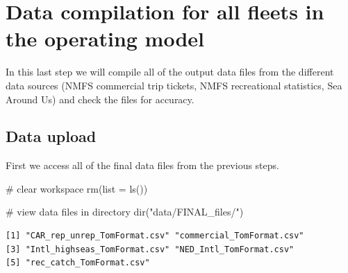 \documentclass[
]{article}
\newenvironment{Shaded}{\begin{snugshade}}{\end{snugshade}}
\newcommand{\AttributeTok}[1]{\textcolor[rgb]{0.40,0.45,0.13}{#1}}
\newcommand{\CommentTok}[1]{\textcolor[rgb]{0.37,0.37,0.37}{#1}}
\newcommand{\FunctionTok}[1]{\textcolor[rgb]{0.28,0.35,0.67}{#1}}
\newcommand{\NormalTok}[1]{\textcolor[rgb]{0.00,0.23,0.31}{#1}}
\newcommand{\StringTok}[1]{\textcolor[rgb]{0.13,0.47,0.30}{#1}}
\begin{document}


\section{Data compilation for all fleets in the operating
model}\label{data-compilation-for-all-fleets-in-the-operating-model}

In this last step we will compile all of the output data files from the
different data sources (NMFS commercial trip tickets, NMFS recreational
statistics, Sea Around Us) and check the files for accuracy.

\subsection{Data upload}\label{data-upload}

First we access all of the final data files from the previous steps.

\begin{Shaded}
\begin{Highlighting}[]
\CommentTok{\# clear workspace}
\FunctionTok{rm}\NormalTok{(}\AttributeTok{list =} \FunctionTok{ls}\NormalTok{())}

\CommentTok{\# view data files in directory}
\FunctionTok{dir}\NormalTok{(}\StringTok{"data/FINAL\_files/"}\NormalTok{)}
\end{Highlighting}
\end{Shaded}

\begin{verbatim}
[1] "CAR_rep_unrep_TomFormat.csv" "commercial_TomFormat.csv"   
[3] "Intl_highseas_TomFormat.csv" "NED_Intl_TomFormat.csv"     
[5] "rec_catch_TomFormat.csv"    
\end{verbatim}
\end{document}

